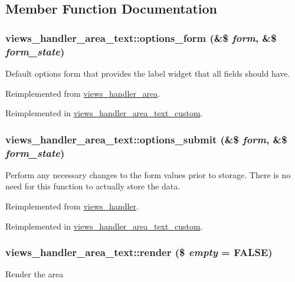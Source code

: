 \subsection{Member Function Documentation}
\hypertarget{classviews__handler__area__text_a2781ce4797304f2ce2a026820e0006fb}{
\subsubsection[{options\_\-form}]{\setlength{\rightskip}{0pt plus 5cm}views\_\-handler\_\-area\_\-text::options\_\-form (\&\$ {\em form}, \/  \&\$ {\em form\_\-state})}}
\label{classviews__handler__area__text_a2781ce4797304f2ce2a026820e0006fb}
Default options form that provides the label widget that all fields should have. 

Reimplemented from \hyperlink{classviews__handler__area_af3615e22fccc744485ddb7978ce812ff}{views\_\-handler\_\-area}.

Reimplemented in \hyperlink{classviews__handler__area__text__custom_a93eb91b0ea21ca78b68b5a4832cc9035}{views\_\-handler\_\-area\_\-text\_\-custom}.\hypertarget{classviews__handler__area__text_a337ccf78771d5b61ba7ded71532f9b48}{
\subsubsection[{options\_\-submit}]{\setlength{\rightskip}{0pt plus 5cm}views\_\-handler\_\-area\_\-text::options\_\-submit (\&\$ {\em form}, \/  \&\$ {\em form\_\-state})}}
\label{classviews__handler__area__text_a337ccf78771d5b61ba7ded71532f9b48}
Perform any necessary changes to the form values prior to storage. There is no need for this function to actually store the data. 

Reimplemented from \hyperlink{classviews__handler_abb55e97dbb1e634b95a1cc9ea836d6e8}{views\_\-handler}.

Reimplemented in \hyperlink{classviews__handler__area__text__custom_a76f34efb470e6c03f7c67e655405e250}{views\_\-handler\_\-area\_\-text\_\-custom}.\hypertarget{classviews__handler__area__text_a61ad1d6b876311e1d09576230654a794}{
\subsubsection[{render}]{\setlength{\rightskip}{0pt plus 5cm}views\_\-handler\_\-area\_\-text::render (\$ {\em empty} = {\ttfamily FALSE})}}
\label{classviews__handler__area__text_a61ad1d6b876311e1d09576230654a794}
Render the area 

